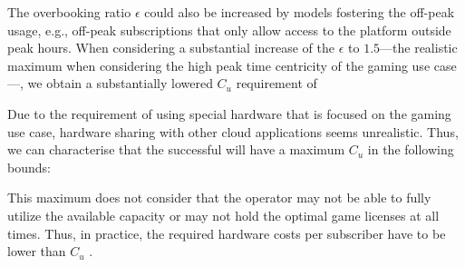 
The overbooking ratio $\epsilon$ could also be increased by models fostering the off-peak usage, e.g., off-peak subscriptions that only allow access to the platform outside peak hours. When considering a substantial increase of the $\epsilon$ to $1.5$---the realistic maximum when considering the high peak time centricity of the gaming use case---, we obtain a substantially lowered $C_{u}$ requirement of 


Due to the requirement of using special hardware that is focused on the gaming use case, hardware sharing with other cloud applications seems unrealistic. Thus, we can characterise that the successful will have a maximum $C_{u}$ in the following bounds:


This maximum does not consider that the operator may not be able to fully utilize the available capacity or may not hold the optimal game licenses at all times. Thus, in practice, the required hardware costs per subscriber have to be lower than $C_{u}$ .




